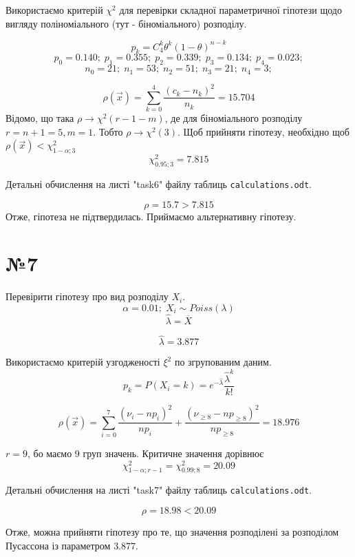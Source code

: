 \documentclass[11pt, a4paper]{article} %
\begin{document}
Використаємо критерій $\chi^2$ для перевірки складної параметричної гіпотези щодо вигляду поліноміального (тут - біноміального) розподілу.

$$p_k = C_4^k \theta^k (1-\theta)^{n-k}$$
$$p_0 = 0.140; \; p_1 = 0.355; \; p_2 = 0.339; \; p_3 = 0.134; \; p_4 = 0.023;$$
$$n_0 = 21; \; n_1 = 53; \; n_2 = 51; \; n_3 = 21; \; n_4 = 3;$$

$$\rho(\vec x) = \sum_{k=0}^4 \frac{(c_k - n_k)^2}{n_k} = 15.704$$
Відомо, що така $\rho \longrightarrow \chi^2(r-1-m)$,
де для біноміального розподілу $r = n+1 = 5, m = 1$.
Тобто $\rho \longrightarrow \chi^2(3)$. Щоб прийняти гіпотезу, необхідно щоб $\rho(\vec x) < \chi^2_{1-\alpha; 3}$
$$\chi^2_{0.95; 3} = 7.815$$

Детальні обчислення на листі "task6" файлу таблиць \texttt{calculations.odt}.

\begin{mdframed}[style=ans]
    $$\rho = 15.7 > 7.815$$
    Отже, гіпотеза не підтвердилась. Приймаємо альтернативну гіпотезу.
\end{mdframed}
\pagebreak

\section*{№7}

\begin{mdframed}
    Перевірити гіпотезу про вид розподілу $X_i$.
    $$\alpha = 0.01; \; X_i \sim Poiss(\lambda)$$
    $$\hat \lambda = \overline X$$
\end{mdframed}

$$\hat\lambda = 3.877$$

Використаємо критерій узгодженості $\xi^2$ по згрупованим даним.
$$p_k = P(X_i = k) = e^{-\hat\lambda}\frac{\hat\lambda^k}{k!}$$

$$\rho(\vec x) = \sum_{i=0}^7 \frac{(\nu_i - n p_i)^2}{n p_i} + \frac{(\nu_{\ge 8} - n p_{\ge 8})^2}{np_{\ge 8}} = 18.976$$

$r=9$, бо маємо 9 груп значень. Критичне значення дорівнює 
$$\chi^2_{1-\alpha; r-1} = \chi^2_{0.99; 8} = 20.09$$

Детальні обчислення на листі "task7" файлу таблиць \texttt{calculations.odt}.

\begin{mdframed}[style=ans]
    $$\rho = 18.98 < 20.09$$

    Отже, можна прийняти гіпотезу про те, що значення розподілені за розподілом Пусассона 
    із параметром $3.877$. 
\end{mdframed}
\pagebreak
\end{document}
